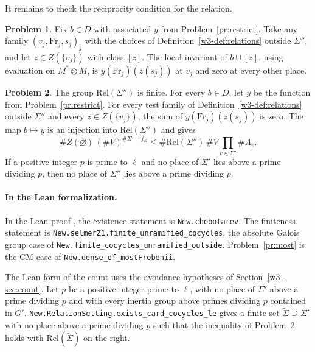 \documentclass[reqno]{amsart}
\theoremstyle{definition}
\newtheorem{problem}{Problem}[section]
\theoremstyle{plain}
\newcommand{\Fr}{\mathrm{Fr}}
\newcommand{\Rel}{\mathrm{Rel}}
\begin{document}
It remains to check the reciprocity condition for the relation.

\begin{problem}\label{pr:local-sum}
Fix \(b\in D\) with associated \(y\) from Problem~\ref{pr:restrict}.
Take any family \((v_j,\Fr_j,s_j)_j\) with the choices of
Definition~\ref{w3-def:relations} outside \(\Sigma''\), and let
\(z\in Z(\{v_j\})\) with class \([z]\).  The local invariant of
\(b\cup[z]\), using evaluation on \(M^*\otimes M\), is
\(y(\Fr_j)(z(s_j))\) at \(v_j\) and zero at every other place.
\end{problem}

\begin{problem}\label{pr:count}
The group \(\Rel(\Sigma'')\) is finite.  For every \(b\in D\), let
\(y\) be the function from Problem~\ref{pr:restrict}.  For every
test family of Definition~\ref{w3-def:relations} outside \(\Sigma''\)
and every \(z\in Z(\{v_j\})\), the sum of \(y(\Fr_j)(z(s_j))\) is
zero.  The map \(b\mapsto y\) is an injection into \(\Rel(\Sigma'')\) and
gives
\[
  \#Z(\varnothing)\,(\#V)^{\#\Sigma'+f_E}
  \le \#\Rel(\Sigma'')\,\#V\prod_{v\in\Sigma'}\#A_v .
\]
If a positive integer \(p\) is prime to \(\ell\) and no place of
\(\Sigma'\) lies above a prime dividing \(p\), then no place of
\(\Sigma''\) lies above a prime dividing \(p\).
\end{problem}

\paragraph{In the Lean formalization.}
\begin{sloppypar}
In the Lean proof \cite{GL}, the existence statement is
\nolinkurl{New.chebotarev}.  The finiteness statement is
\nolinkurl{New.selmerZ1.finite_unramified_cocycles}, the absolute
Galois group case of \nolinkurl{New.finite_cocycles_unramified_outside}.
Problem~\ref{pr:most} is the CM case of \nolinkurl{New.dense_of_mostFrobenii}.

The Lean form of the count uses the avoidance hypotheses of
Section~\ref{w3-sec:count}.  Let \(p\) be a positive integer prime to
\(\ell\), with no place of \(\Sigma'\) above a prime dividing \(p\)
and with every inertia group above primes dividing \(p\) contained
in \(G'\).
\nolinkurl{New.RelationSetting.exists_card_cocycles_le} gives a
finite set \(\widetilde\Sigma\supseteq\Sigma'\) with no place above a prime dividing
\(p\) such that the inequality of Problem~\ref{pr:count} holds with
\(\Rel(\widetilde\Sigma)\) on the right.
\end{sloppypar}
\end{document}
